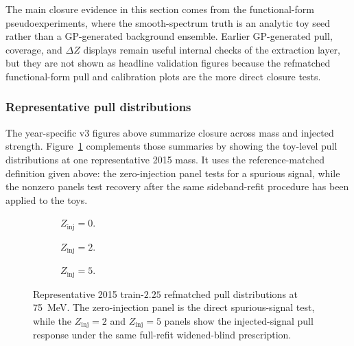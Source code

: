 The main closure evidence in this section comes from the functional-form
pseudoexperiments, where
the smooth-spectrum truth is an analytic toy seed rather than a GP-generated background
ensemble. Earlier GP-generated pull, coverage, and $\Delta Z$ displays remain useful
internal checks of the extraction layer, but they are not shown as headline validation
figures because the refmatched functional-form pull and calibration plots are the more
direct closure tests.

\subsubsection{Representative pull distributions}

The year-specific v3 figures above summarize closure across mass and injected strength.
Figure~\ref{fig:refmatched-train225-pulls-2015} complements those summaries by showing
the toy-level pull distributions at one representative 2015 mass. It uses the
reference-matched definition given above: the zero-injection panel tests for a spurious
signal, while the nonzero panels test recovery after the same sideband-refit procedure
has been applied to the toys.

\begin{figure}[p]
\centering
\begin{subfigure}[t]{0.60\linewidth}
  \centering
  \caption{$Z_{\mathrm{inj}}=0$.}
\end{subfigure}
\par\vspace{0.25em}
\begin{subfigure}[t]{0.60\linewidth}
  \centering
  \caption{$Z_{\mathrm{inj}}=2$.}
\end{subfigure}
\par\vspace{0.25em}
\begin{subfigure}[t]{0.60\linewidth}
  \centering
  \caption{$Z_{\mathrm{inj}}=5$.}
\end{subfigure}
\caption{Representative 2015 train-$2.25$ refmatched pull distributions at
\SI{75}{MeV}. The zero-injection panel is the direct spurious-signal test, while the
$Z_{\mathrm{inj}}=2$ and $Z_{\mathrm{inj}}=5$ panels show the injected-signal pull
response under the same full-refit widened-blind prescription.}
\label{fig:refmatched-train225-pulls-2015}
\end{figure}

